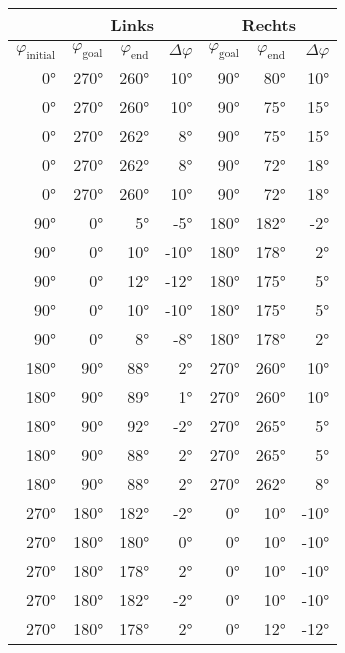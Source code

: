 \begin{tabular}{r||rrr||rrr}
    & \multicolumn{3}{c||}{Links} & \multicolumn{3}{c}{Rechts} \\ \hline
    $\varphi_{\text{initial}}$ & $\varphi_{\text{goal}}$ & $\varphi_{\text{end}}$ & $\Delta\varphi$ & $\varphi_{\text{goal}}$ & $\varphi_{\text{end}}$ & $\Delta\varphi$\\ \hline
    0°   & 270°   & 260°    & 10°   & 90°   & 80°  & 10°  \\
    0°   & 270°   & 260°    & 10°   & 90°   & 75°  & 15°  \\
    0°   & 270°   & 262°    & 8°    & 90°   & 75°  & 15°  \\
    0°   & 270°   & 262°    & 8°    & 90°   & 72°  & 18°  \\
    0°   & 270°   & 260°    & 10°   & 90°   & 72°  & 18°  \\ \hline
    90°  & 0°     & 5°      &-5°    & 180°  & 182° & -2°  \\
    90°  & 0°     & 10°     &-10°   & 180°  & 178° & 2°   \\
    90°  & 0°     & 12°     &-12°   & 180°  & 175° & 5°   \\
    90°  & 0°     & 10°     &-10°   & 180°  & 175° & 5°   \\
    90°  & 0°     & 8°      &-8°    & 180°  & 178° & 2°   \\ \hline
    180° & 90°    & 88°    & 2°     & 270°  & 260°  & 10° \\
    180° & 90°    & 89°    & 1°     & 270°  & 260°  & 10° \\
    180° & 90°    & 92°    & -2°    & 270°  & 265°  & 5°  \\
    180° & 90°    & 88°    & 2°     & 270°  & 265°  & 5°  \\
    180° & 90°    & 88°    & 2°     & 270°  & 262°  & 8°  \\ \hline
    270° & 180°   & 182°   & -2°    & 0°    & 10°   & -10° \\
    270° & 180°   & 180°   & 0°     & 0°    & 10°   & -10° \\
    270° & 180°   & 178°   & 2°     & 0°    & 10°   & -10° \\
    270° & 180°   & 182°   & -2°    & 0°    & 10°   & -10° \\
    270° & 180°   & 178°   & 2°     & 0°    & 12°   & -12°
\end{tabular}
